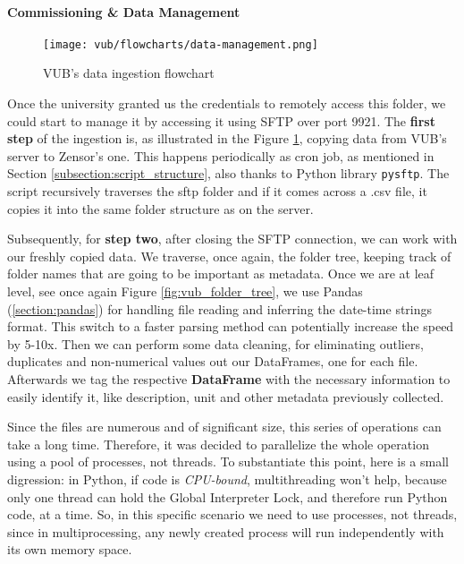 \paragraph{Commissioning \& Data Management}
\begin{figure}[ht]
    \texttt{[image: vub/flowcharts/data-management.png]}
    \caption{\ac{VUB}'s data ingestion flowchart}
    \label{fig:vub_ingestion}
\end{figure}
Once the university granted us the credentials to remotely access this folder, we could start to manage it by accessing it using \ac{SFTP} over port 9921. %
The \textbf{first step} of the ingestion is, as illustrated in the Figure \ref{fig:vub_ingestion}, copying data from \ac{VUB}'s server to Zensor's one. 
This happens periodically as cron job, as mentioned in Section \ref{subsection:script_structure}, also thanks to Python library \texttt{pysftp}. %
The script recursively traverses the sftp folder and if it comes across a .csv file, it copies it into the same folder structure as on the server.

Subsequently, for \textbf{step two}, after closing the \ac{SFTP} connection, we can work with our freshly copied data. We traverse, once again, the folder tree, keeping track of
folder names that are going to be important as metadata. Once we are at leaf level, see once again Figure \ref{fig:vub_folder_tree}, we use 
Pandas (\ref{section:pandas}) for handling file reading and inferring the date-time strings format. This switch to a faster parsing method can potentially increase the speed by 5-10x. %
Then we can perform some data cleaning, for eliminating outliers, duplicates and non-numerical values out our DataFrames, one for each file.
Afterwards we tag the respective \textbf{DataFrame} with the necessary information to easily identify it, like description, unit and other metadata previously collected.

Since the files are numerous and of significant size, this series of operations can take a long time. 
Therefore, it was decided to parallelize the whole operation using a pool of processes, not threads. To substantiate this point, here is a small digression: 
in Python, if code is \textit{CPU-bound}, multithreading won't help, because only one thread can hold the Global Interpreter Lock, and therefore run Python code, at a time. 
So, in this specific scenario we need to use processes, not threads, since in multiprocessing, any newly created process will run independently with its own memory space.

